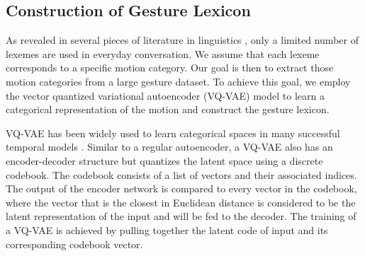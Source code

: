 \subsection{Construction of Gesture Lexicon}
\label{subsec:gesture_style_embedding}
As revealed in several pieces of literature in linguistics \citep{Neff2008Gesture,Kipp2004_Gesture,Webb1996_Linguistic}, only a limited number of lexemes are used in everyday conversation. We assume that each lexeme corresponds to a specific motion category. Our goal is then to extract those motion categories from a large gesture dataset. To achieve this goal, we employ the vector quantized variational autoencoder (VQ-VAE) model \citep{oord2017neural} to learn a categorical representation of the motion and construct the gesture lexicon.

VQ-VAE has been widely used to learn categorical spaces in many successful temporal models \citep{prafulla2020jukebox, baevski2020vq-wav2vec, yan2021videogpt,ramesh2021DALLE}. Similar to a regular autoencoder, a VQ-VAE also has an encoder-decoder structure but quantizes the latent space using a discrete codebook. The codebook consists of a list of vectors and their associated indices. The output of the encoder network is compared to every vector in the codebook, where the vector that is the closest in Euclidean distance is considered to be the latent representation of the input and will be fed to the decoder. The training of a VQ-VAE is achieved by pulling together the latent code of input and its corresponding codebook vector.

